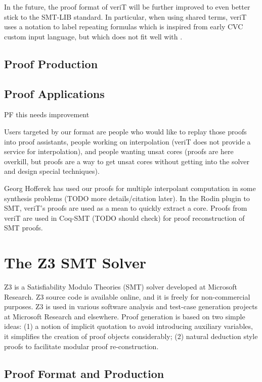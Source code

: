 \documentclass{llncs}
\begin{document}
In the future, the proof format of veriT will be further improved to even better
stick to the SMT-LIB standard.  In particular, when using shared terms, veriT
uses a notation to label repeating formulas which is inspired from early CVC custom input language, but which does not fit well with .

\subsection{Proof Production}



\subsection{Proof Applications}

PF this needs improvement


Users targeted by our format are people who would like to replay those proofs into proof assistants, people working on interpolation (veriT does not provide a service for interpolation), and people wanting unsat cores (proofs are here overkill, but proofs are a way to get unsat cores without getting into the solver and design special techniques).

Georg Hofferek has used our proofs for multiple interpolant computation in some synthesis problems (TODO more details/citation later).  In the Rodin plugin to SMT, veriT's proofs are used as a mean to quickly extract a core.  Proofs from veriT are used in Coq-SMT (TODO should check) for proof reconstruction of SMT proofs.

\section{The Z3 SMT Solver}
\label{sec:z3}

Z3 is a Satisfiability Modulo Theories (SMT) solver developed at
Microsoft Research.  Z3 source code is available online, and it is
freely for non-commercial purposes.  Z3 is used in various software
analysis and test-case generation projects at Microsoft Research and
elsewhere.  Proof generation is based on two simple ideas: (1) a
notion of implicit quotation to avoid introducing auxiliary variables,
it simplifies the creation of proof objects considerably; (2) natural
deduction style proofs to facilitate modular proof re-construction.

\subsection{Proof Format and Production}
\end{document}
